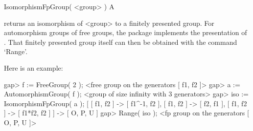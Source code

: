 \>IsomorphismFpGroup( <group> ) A

returns an isomorphism of <group> to a finitely presented group.  
For automorphism groups of free groups, the {\FGA} package implements
the presentation of \cite{Neumann33}.
That finitely presented group itself can then be obtained with the
command `Range'.

Here is an example:

\beginexample
gap> f := FreeGroup( 2 );
<free group on the generators [ f1, f2 ]>
gap> a := AutomorphismGroup( f );
<group of size infinity with 3 generators>
gap> iso := IsomorphismFpGroup( a );
[ [ f1, f2 ] -> [ f1^-1, f2 ], [ f1, f2 ] -> [ f2, f1 ], 
  [ f1, f2 ] -> [ f1*f2, f2 ] ] -> [ O, P, U ]
gap> Range( iso );
<fp group on the generators [ O, P, U ]>
\endexample



